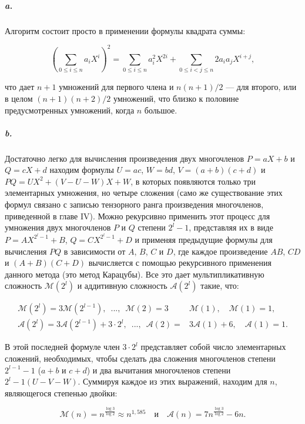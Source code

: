 \documentclass{../../template/mai_book}
\begin{document}
\subparagraph{a.} Алгоритм состоит просто в применении формулы квадрата
суммы:

\begin{equation*}
\left( \sum_{0 \leqslant i \leqslant n} a_i X^i \right)^2 = \sum_{0 \leqslant i \leqslant n} a_i^2 X^{2i} + \sum_{0 \leqslant i < j \leqslant n} 2a_i a_j X^{i + j},
\end{equation*}

\noindent
что дает $n + 1$ умножений для первого члена и $n(n + 1)/2$ — для  второго, или в целом $(n + 1)(n + 2)/2$ умножений, что близко к половине предусмотренных умножений, когда $n$ большое.

\subparagraph{b.} Достаточно легко для вычисления произведения двух многочленов $P = aX + b$ и $Q = cX + d$ находим формулы $U = ac$, $W = bd$, $V = (a + b)(c + d)$ и $PQ = UX^2 + (V - U - W)X + W$, в которых появляются только три элементарных умножения, но четыре сложения (само же существование этих формул связано с записью тензорного ранга произведения многочленов, приведенной в главе IV). Можно рекурсивно применить этот процесс для умножения двух многочленов $P$ и $Q$ степени $2^l - 1$, представляя их в виде $P = AX^{2^l - 1} + B$, $Q = CX^{2^l - 1} + D$ и применяя предыдущие формулы для вычисления $PQ$ в зависимости от $A$, $B$, $C$ и $D$, где каждое произведение $AB$, $CD$ и $(A + B)(C + D)$ вычисляется с помощью рекурсивного применения данного метода (это метод Карацубы). Все это дает мультипликативную сложность $\mathcal{M}(2^l)$ и аддитивную сложность $\mathcal{A}(2^l)$ такие, что:

\begin{equation*}
	\begin{split}
	\mathcal{M}(2^l) = 3\mathcal{M}(2^{l - 1}), \enspace ..., \enspace \mathcal{M}(2) = 3&\mathcal{M}(1), \quad \mathcal{M}(1) = 1,
	\\
	\mathcal{A}(2^l) = 3\mathcal{A}(2^{l - 1}) + 3 \cdot 2^l, \enspace ..., \enspace \mathcal{A}(2) = &3\mathcal{A}(1) + 6, \quad \mathcal{A}(1) = 1.
	\end{split}
\end{equation*}

\noindent
В этой последней формуле член $3 \cdot 2^l$ представляет собой число элементарных сложений, необходимых, чтобы сделать два сложения многочленов степени $2^{l - 1} - 1$ ($a + b$ и $c + d$) и два вычитания многочленов степени $2^l - 1(U - V - W)$. Суммируя каждое из этих выражений, находим для $n$, являющегося степенью двойки:

\begin{equation*}
\mathcal{M}(n) = n^{\frac{\log 3}{\log 2}} \approx n^{1,585} \quad \text{и} \quad \mathcal{A}(n) = 7n^{\frac{\log 3}{\log 2}} - 6n.
\end{equation*}
\end{document}
